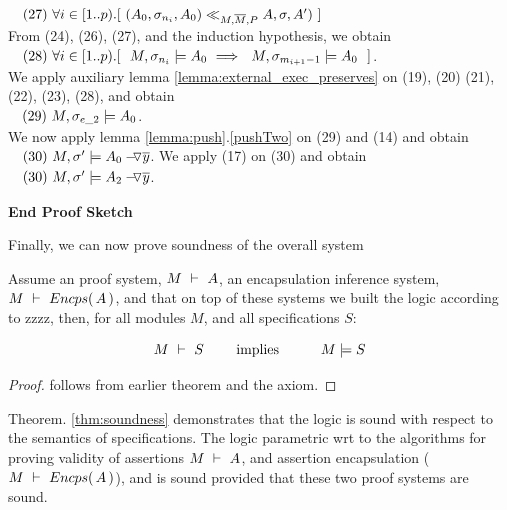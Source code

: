 \begin{description}
$\ \strut \ \ (27)\   \forall i\in[1..p).[ \ ( A_0, \sigma_{n_{i}}, A_0 ) \ll_{M,\Mtwo,P}  A, \sigma, A' )\ ]$
\\
From (24), (26), (27), and the induction hypothesis, we obtain\\
$\ \strut \ \ (28)\    \forall i\in[1..p).[ \ \  M, \sigma_{n_{i}} \models A_0 \ \Longrightarrow \ \ M, \sigma_{m_{i+1}-1} \models A_0 \ \ ]$.\\
We apply auxiliary lemma \ref{lemma:external_exec_preserves} on (19), (20) (21), (22), (23), (28), and obtain\\
$\ \strut \ \ (29) \   M, \sigma_{e\_2} \models A_0$.\\
We now apply lemma \ref{lemma:push}.\ref{pushTwo} on (29) and  (14) and obtain\\
$\ \strut \ \ (30) \   M, \sigma'  \models \PushAS  {y}{A_0}$.
We apply (17) on (30) and obtain\\
$\ \strut \ \ (30) \   M, \sigma'  \models \PushAS  {y}{A_2}$.
\end{description}
\noindent
\vspace{.1cm}
  {\textbf{End Proof Sketch}} 

\vspace{1cm}

Finally, we can now prove soundness of the overall system

\begin{theorem}[Soundness]
\label{thm:soundness}
Assume an \SpecO proof system, $\proves{M}{A}$, 
an encapsulation inference system, $\proves{M}{\encaps{A}}$,
 and  that on top of these systems we built
 the \SpecLang logic according to zzzz,  then, for    all modules $M$, and all \SpecLang specifications  $S$:
 
 $$\proves{M}{S}\ \ \ \ \ \ \ \mbox{implies}\ \ \ \ \ \  \ \ \ \satisfies{M}{S}$$
\end{theorem}

\begin{proof}
follows from earlier theorem and the axiom.
\end{proof}
 


Theorem. \ref{thm:soundness} demonstrates 
 that the   \SpecLang logic is sound with respect to the semantics of \SpecLang specifications.
 The \SpecLang logic parametric wrt to the algorithms for proving validity of assertions
 $\proves{M}{A}$, and 
 assertion encapsulation ($\proves{M}{\encaps{A}}$), and is sound
 provided that these two proof systems are sound.

